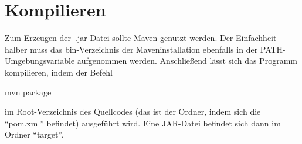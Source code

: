 \section{Kompilieren}\label{sec:kompilieren}
Zum Erzeugen der~.jar-Datei sollte Maven genutzt werden.
Der Einfachheit halber muss das bin-Verzeichnis der Maveninstallation ebenfalls in der PATH-Umgebungsvariable aufgenommen werden.
Anschließend lässt sich das Programm kompilieren, indem der Befehl
\begin{center}
    \colorbox{gray!20}{
        \begin{minipage}{0.9\textwidth}
            mvn package
        \end{minipage}
    }
\end{center}
im Root-Verzeichnis des Quellcodes (das ist der Ordner, indem sich die \enquote{pom.xml} befindet) ausgeführt wird.
Eine JAR-Datei befindet sich dann im Ordner \enquote{target}.
